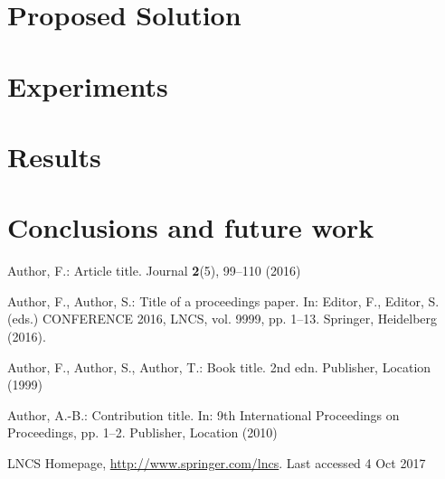 \documentclass[runningheads]{llncs}
\begin{document}
\section{Proposed Solution}

\section{Experiments}

\section{Results}

\section{Conclusions and future work}

%
%
%
% 
% 
%
\begin{thebibliography}{8}
Author, F.: Article title. Journal \textbf{2}(5), 99--110 (2016)

Author, F., Author, S.: Title of a proceedings paper. In: Editor,
F., Editor, S. (eds.) CONFERENCE 2016, LNCS, vol. 9999, pp. 1--13.
Springer, Heidelberg (2016). 

Author, F., Author, S., Author, T.: Book title. 2nd edn. Publisher,
Location (1999)

Author, A.-B.: Contribution title. In: 9th International Proceedings
on Proceedings, pp. 1--2. Publisher, Location (2010)

LNCS Homepage, \url{http://www.springer.com/lncs}. Last accessed 4
Oct 2017
\end{thebibliography}
\end{document}
